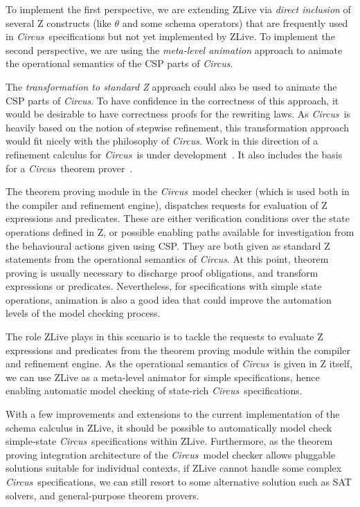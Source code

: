 \documentclass{llncs}
\newcommand{\Circus}{{\sf\slshape Circus}}
\begin{document}
    To implement the first perspective, we are extending ZLive via
    \emph{direct inclusion} of several Z constructs (like $\theta$ and
    some schema operators) that are frequently used in \Circus\
    specifications but not yet implemented by ZLive.  To implement the
    second perspective, we are using the \emph{meta-level animation}
    approach to animate the operational semantics of the CSP parts of
    \Circus.

    The \emph{transformation to standard Z} approach could also be
    used to animate the CSP parts of \Circus.  To have confidence in
    the correctness of this approach, it would be desirable to have
    correctness proofs for the rewriting laws.  As \Circus\ is heavily
    based on the notion of stepwise refinement, this transformation
    approach would fit nicely with the philosophy of \Circus.  Work in
    this direction of a refinement calculus for \Circus\ is under
    development~\cite{circus.ref:marcel}. It also includes the basis
    for a \Circus\ theorem prover~\cite{circus.sem:pp}.

    The theorem proving module in the \Circus\ model checker (which is
    used both in the compiler and refinement engine), dispatches
    requests for evaluation of Z expressions and predicates. These are
    either verification conditions over the state operations defined
    in Z, or possible enabling paths available for investigation from
    the behavioural actions given using CSP.  They are both given as
    standard Z statements from the operational semantics of \Circus.
    At this point, theorem proving is usually necessary to discharge
    proof obligations, and transform expressions or
    predicates. Nevertheless, for specifications with simple state
    operations, animation is also a good idea that could improve the
    automation levels of the model checking process.

    The role ZLive plays in this scenario is to tackle the requests to
    evaluate Z expressions and predicates from the theorem proving module
    within the compiler and refinement engine.  As the operational semantics of
    \Circus\ is given in Z itself, we can use ZLive as a meta-level
    animator for simple specifications, hence enabling automatic model
    checking of state-rich \Circus\ specifications.

    With a few improvements and extensions to the current implementation of
    the schema calculus in ZLive, it should be possible to automatically
    model check simple-state \Circus\ specifications within ZLive.
    Furthermore, as the theorem proving integration architecture of the
    \Circus\ model checker allows pluggable solutions suitable for individual
    contexts, if ZLive cannot handle some complex \Circus\ specifications,
    we can still resort to some alternative solution such as SAT solvers,
    and general-purpose theorem provers.
\end{document}
